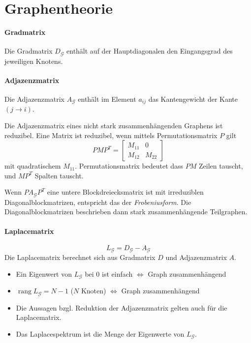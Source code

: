 \section{Graphentheorie}
\paragraph{Gradmatrix}
Die Gradmatrix $D_\mathcal{G}$ enthält auf der Hauptdiagonalen den Eingangsgrad des jeweiligen Knotens.

\paragraph{Adjazenzmatrix}
Die Adjazenzmatrix $A_\mathcal{G}$ enthält im Element $a_{ij}$
das Kantengewicht der Kante $(j \rightarrow i)$.

Die Adjazenzmatrix eines nicht stark zusammenhängenden Graphens ist reduzibel.
Eine Matrix ist reduzibel, wenn mittels Permutationsmatrix $P$ gilt
\begin{equation}
    PMP^T = \begin{bmatrix}
        M_{11} & 0 \\
        M_{12} & M_{22}
    \end{bmatrix}
\end{equation}
mit quadratischem $M_{11}$.
Permutationsmatrix bedeutet dass $PM$ Zeilen tauscht, und $MP^T$ Spalten tauscht.

Wenn $PA_\mathcal{G}P^T$ eine untere Blockdreiecksmatrix ist mit irreduziblen
Diagonalblockmatrizen, entspricht das der \emph{Frobeniusform}.
Die Diagonalblockmatrizen beschrieben dann stark zusammenhängende Teilgraphen.


\paragraph{Laplacematrix}
\begin{equation}
    \tag{Laplacematrix}
    L_\mathcal{G} = D_\mathcal{G} - A_\mathcal{G}
    \label{eqn:laplace_matrix}
\end{equation}
Die Laplacematrix berechnet sich aus Gradmatrix $D$ und
Adjazenzmatrix $A$.

\begin{itemize}
    \item Ein Eigenwert von $L_\mathcal{G}$ bei 0 ist einfach $\iff$ Graph zusammenhängend
    \item $\operatorname{rang} L_\mathcal{G} = N-1$ ($N$ Knoten) $\iff$ Graph zusammenhängend
    \item Die Aussagen bzgl. Reduktion der Adjazenzmatrix gelten auch für die Laplacematrix.
    \item Das Laplacespektrum ist die Menge der Eigenwerte von $L_\mathcal{G}$.
\end{itemize}

